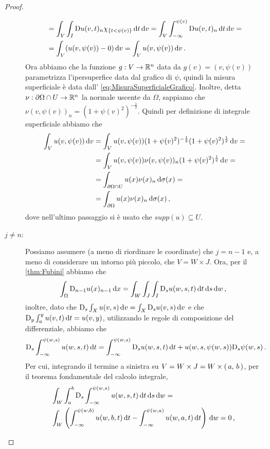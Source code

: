 \begin{proof}
\begin{description}
\begin{align*}
				& = \int_V \int_I \mathrm D u(v,t)_n \chi_{\{t<\psi(v)\}} \,\mathrm d t \,\mathrm d v =
				\int_V \int_{-\infty}^{\psi(v)} \mathrm D u(v,t)_n \,\mathrm d t \,\mathrm d v = \\
				& = \int_V (u(v,\psi(v)) - 0) \,\mathrm d v = \int_V u(v,\psi(v)) \,\mathrm d v\, \text{. }
			\end{align*}
			Ora abbiamo che la funzione $g:V\rightarrow \mathbb R^n$ data da $g(v)=(v,\psi(v))$ parametrizza l'ipersuperfice data dal grafico di
			$\psi$, quindi la misura superficiale è data dall' \cref{eq:MisuraSuperficialeGrafico}.
			Inoltre, detta $\nu:\partial \Omega \cap U \rightarrow \mathbb R^n$ la normale uscente da $\Omega$, sappiamo che
			$\nu(v,\psi(v))_n=(1+\psi(v)^2)^{-\frac{1}{2}}$. Quindi per definizione di integrale superficiale abbiamo che
			\begin{align*}
				\int_V u(v,\psi(v)) \,\mathrm d v &= \int_V u(v,\psi(v)) (1+\psi(v)^2)^{-\frac{1}{2}} (1+\psi(v)^2)^{\frac{1}{2}} \,\mathrm d v = \\
				& = \int_V u(v,\psi(v)) \nu(v,\psi(v))_n (1+\psi(v)^2)^{\frac{1}{2}} \,\mathrm d v = \\
				& = \int_{\partial \Omega \cap U} u(x) \nu(x)_n \,\mathrm d \sigma(x) = \\
				& = \int_{\partial \Omega} u(x) \nu(x)_n \,\mathrm d \sigma(x)\, \text{, }
			\end{align*}
			dove nell'ultimo passaggio si è usato che $supp(u)\subseteq U$.
		\item [$j\neq n$:] Possiamo assumere (a meno di riordinare le coordinate) che $j=n-1$ e, a meno di considerare un intorno più piccolo,
			che $V=W \times J$. Ora, per il \cref{thm:Fubini} abbiamo che
			\[
				\int_{\Omega} \mathrm D_{n-1} u(x)_{n-1} \,\mathrm d x = \int_W \int_J \int_I \mathrm D_s u(w,s,t) \,\mathrm d t \,\mathrm d s \,\mathrm d w\, \text{, }
			\]
			inoltre, dato che $\mathrm D_s \int_X u(v,s)\,\mathrm d v = \int_X \mathrm D_s u(v,s)\,\mathrm d v$ e che $\mathrm D_y \int_a^y u(v,t)\,\mathrm d t=u(v,y)$,
			utilizzando le regole di composizione del differenziale, abbiamo che
			\[
				\mathrm D_s \int_{-\infty}^{\psi(w,s)} u(w,s,t) \,\mathrm d t =
				\int_{-\infty}^{\psi(w,s)} \mathrm D_s u(w,s,t) \,\mathrm d t + u(w,s,\psi(w,s))\mathrm D_s \psi (w,s)\, \text{. }
			\]
			Per cui, integrando il termine a sinistra su $V=W\times J=W\times \left(\,a,\,b\,\right)$, per il teorema fondamentale del
			calcolo integrale,
			\begin{align*}
				&\int_W \int_a^b \mathrm D_s \int_{-\infty}^{\psi(w,s)} u(w,s,t) \,\mathrm d t \,\mathrm d s \,\mathrm d w = \\
				&\int_W \left(\int_{-\infty}^{\psi(w,b)} u(w,b,t) \,\mathrm d t - \int_{-\infty}^{\psi(w,a)} u(w,a,t) \,\mathrm d t\right) \,\mathrm d w
				= 0\, \text{, }
			\end{align*}

\end{description}
\end{proof}
